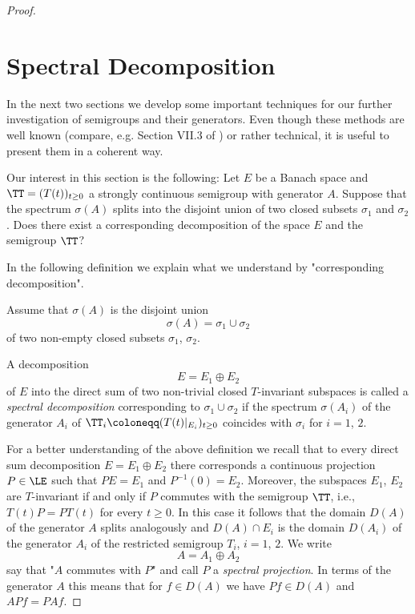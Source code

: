 \begin{proof}
\section{Spectral Decomposition}\label{sec:a3-3}

In the next two sections we develop some important techniques for our further investigation of semigroups and their generators.
Even though these methods are well known (compare, e.g. Section VII.3 of \citet{dunfordschwartz:1958}) or rather technical, it is useful to present them in a coherent way.

Our interest in this section is the following: Let $E$ be a Banach space and $\TT = (T(t))_{t \geq 0}$ a strongly continuous semigroup with generator $A$.
Suppose that the spectrum $\sigma(A)$ splits into the disjoint union of two closed subsets $\sigma_{1}$ and $\sigma_{2}$.
Does there exist a corresponding decomposition of the space $E$ and the semigroup $\TT$?

In the following definition we explain what we understand by "corresponding decomposition".

\begin{definition}\label{def:a3-3.1}

Assume that $\sigma(A)$ is the disjoint union
\[
\sigma(A) = \sigma_{1} \cup \sigma_{2}
\]
of two non-empty closed subsets $\sigma_{1}$, $\sigma_{2}$.

A decomposition
\[
E = E_{1} \oplus E_{2}
\]
of $E$ into the direct sum of two non-trivial closed $T$-invariant subspaces is called a \emph{spectral decomposition} corresponding to $\sigma_{1} \cup \sigma_{2}$ if the spectrum $\sigma(A_{i})$ of the generator $A_{i}$ of $\TT_{i} \coloneqq (T(t)|_{E_{i}})_{t \geq 0}$ coincides with $\sigma_{i}$ for $i = 1$, $2$.
\end{definition}



\newpage

For a better understanding of the above definition we recall that to every direct sum decomposition $E = E_{1} \oplus E_{2}$ there corresponds a continuous projection $P \in \LE$ such that $PE = E_{1}$ and $P^{-1}(0) = E_{2}$.
Moreover, the subspaces $E_{1}$, $E_{2}$ are $T$-invariant if and only if $P$ commutes with the semigroup $\TT$, i.e., $T(t)P = PT(t)$ for every $t \geq 0$.
In this case it follows that the domain $D(A)$ of the generator $A$ splits analogously and $D(A) \cap E_{i}$ is the domain $D(A_{i})$ of the generator $A_{i}$ of the restricted semigroup $T_{i}$, $i = 1$, $2$.
We write
\[
A = A_{1} \oplus A_{2}
\]
say that "$A$ commutes with $P$" and call $P$ a \emph{spectral projection}.
In terms of the generator $A$ this means that for $f \in D(A)$ we have $Pf \in D(A)$ and $APf = PAf$.


\end{proof}
